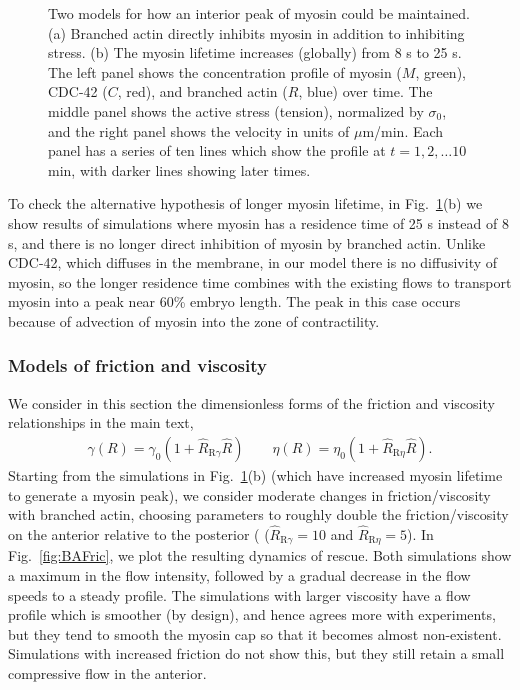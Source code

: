 \documentclass[11pt]{article}
\newcommand{\6}[1]{#1_{\text{6}}}
\newcommand{\3}[1]{#1_{\text{3}}}
\begin{document}
\begin{figure}
\centering
{}
\caption{\label{fig:BAIn} Two models for how an interior peak of myosin could be maintained. (a) Branched actin directly inhibits myosin in addition to inhibiting stress. (b) The myosin lifetime increases (globally) from 8 s to 25 s. The left panel shows the concentration profile of myosin ($M$, green), CDC-42 ($C$, red), and branched actin ($R$, blue) over time. The middle panel shows the active stress (tension), normalized by $\sigma_0$, and the right panel shows the velocity in units of $\mu$m/min. Each panel has a series of ten lines which show the profile at $t=1, 2, \dots 10$ min, with darker lines showing later times.}
\end{figure}

To check the alternative hypothesis of longer myosin lifetime, in Fig.\ \ref{fig:BAIn}(b) we show results of simulations where myosin has a residence time of 25 s instead of 8 s, and there is no longer direct inhibition of myosin by branched actin. Unlike CDC-42, which diffuses in the membrane, in our model there is no diffusivity of myosin, so the longer residence time combines with the existing flows to transport myosin into a peak near 60\% embryo length. The peak in this case occurs because of advection of myosin into the zone of contractility. 

\subsubsection{Models of friction and viscosity}
We consider in this section the dimensionless forms of the friction and viscosity relationships in the main text,  
\begin{gather*}
\gamma(R)=\gamma_0 \left(1+\hat R_\text{R$\gamma$}\hat R\right) \qquad \eta(R)=\eta_0\left(1+\hat R_\text{R$\eta$} \hat R\right).
\end{gather*}
Starting from the simulations in Fig.\ \ref{fig:BAIn}(b) (which have increased myosin lifetime to generate a myosin peak), we consider moderate changes in friction/viscosity with branched actin, choosing parameters to roughly double the friction/viscosity on the anterior relative to the posterior ( ($\hat R_\text{R$\gamma$}=10$ and $\hat R_\text{R$\eta$}=5$). In Fig.\ \ref{fig:BAFric}, we plot the resulting dynamics of rescue. Both simulations show a maximum in the flow intensity, followed by a gradual decrease in the flow speeds to a steady profile. The simulations with larger viscosity have a flow profile which is smoother (by design), and hence agrees more with experiments, but they tend to smooth the myosin cap so that it becomes almost non-existent. Simulations with increased friction do not show this, but they still retain a small compressive flow in the anterior. 
\end{document}
